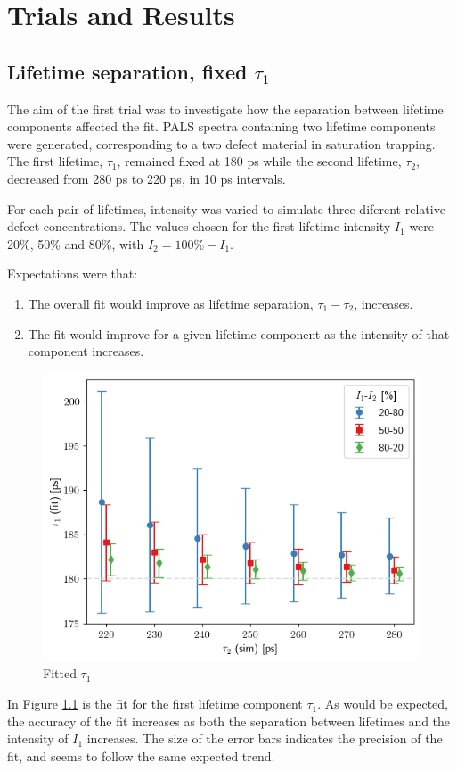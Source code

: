 \chapter{Trials and Results}

\section{Lifetime separation, fixed $\tau_1$}

The aim of the first trial was to investigate how the separation between lifetime components affected the fit. PALS spectra containing two lifetime components were generated, corresponding to a two defect material in saturation trapping. The first lifetime, $\tau_1$, remained fixed at 180 ps while the second lifetime, $\tau_2$, decreased from 280 ps to 220 ps, in 10 ps intervals. 

For each pair of lifetimes, intensity was varied to simulate three diferent relative defect concentrations. The values chosen for the first lifetime intensity $I_1$ were 20\%, 50\% and 80\%, with $I_2 = 100\%-I_1$. 

Expectations were that:
\begin{enumerate}[label=(\roman*)]
    \item The overall fit would improve as lifetime separation, $\tau_1-\tau_2$, increases.
    \item The fit would improve for a given lifetime component as the intensity of that component increases.
\end{enumerate}

\begin{figure} [h]
    \centering
    \includegraphics[width=0.6\linewidth]{Batch 1+2/Batch1+2/output/plotfin/t1.png}
    \caption{Fitted $\tau_1$}
    \label{fig:180-tau1}
\end{figure}

In Figure \ref{fig:180-tau1} is the fit for the first lifetime component $\tau_1$. As would be expected, the accuracy of the fit increases as both the separation between lifetimes and the intensity of $I_1$ increases. The size of the error bars indicates the precision of the fit, and seems to follow the same expected trend.


